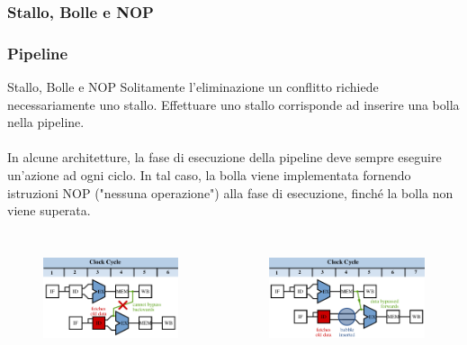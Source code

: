 \subsubsection[Stallo, Bolle e NOP]{Stallo, Bolle e NOP}
\begin{frame}
	\frametitle{ Pipeline}
	
	\begin{block}{Stallo, Bolle e NOP}
		Solitamente l'eliminazione un conflitto richiede necessariamente uno stallo. Effettuare uno stallo corrisponde ad inserire una bolla nella pipeline.\\~\\
		In alcune architetture, la fase di esecuzione della pipeline deve sempre eseguire un'azione ad ogni ciclo. In tal caso, la bolla viene implementata fornendo istruzioni NOP ("nessuna operazione") alla fase di esecuzione, finché la bolla non viene superata.
		\begin{columns}
			\begin{figure}[!htbp]
				\centering 
				\includegraphics[width=0.75\linewidth]{images/7_pipeline/Data_Forwarding_(Two_Stage,_error).pdf}
				\label{fig:pipeline_data_forwarding_error}
			\end{figure}
				
			\begin{figure}[!htbp]
				\centering 
				\includegraphics[width=0.85\linewidth]{images/7_pipeline/Data_Forwarding_(Two_Stage).pdf}
				\label{fig:pipeline_data_forwarding_bubble}
			\end{figure}
		 \end{columns}
	 \end{block}
\end{frame}


